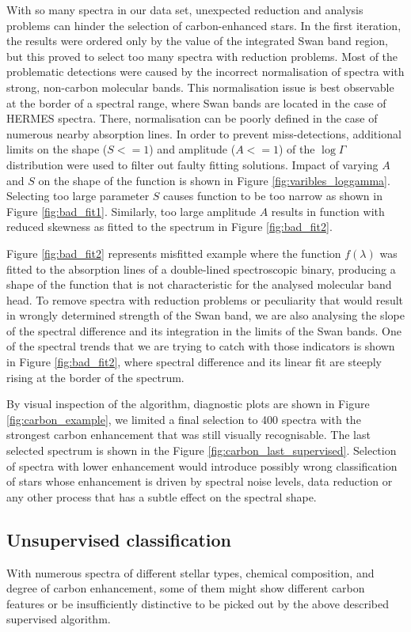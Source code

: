 With so many spectra in our data set, unexpected reduction and analysis problems can hinder the selection of carbon-enhanced stars. In the first iteration, the results were ordered only by the value of the integrated Swan band region, but this proved to select too many spectra with reduction problems. Most of the problematic detections were caused by the incorrect normalisation of spectra with strong, non-carbon molecular bands. This normalisation issue is best observable at the border of a spectral range, where Swan bands are located in the case of HERMES spectra. There, normalisation can be poorly defined in the case of numerous nearby absorption lines. In order to prevent miss-detections, additional limits on the shape ($S <= 1$) and amplitude ($A <= 1$) of the $\log{}\Gamma$ distribution were used to filter out faulty fitting solutions. Impact of varying $A$ and $S$ on the shape of the function is shown in Figure \ref{fig:varibles_loggamma}. Selecting too large parameter $S$ causes function to be too narrow as shown in Figure \ref{fig:bad_fit1}. Similarly, too large amplitude $A$ results in function with reduced skewness as fitted to the spectrum in Figure \ref{fig:bad_fit2}. 

Figure \ref{fig:bad_fit2} represents misfitted example where the function $f(\lambda)$ was fitted to the absorption lines of a double-lined spectroscopic binary, producing a shape of the function that is not characteristic for the analysed molecular band head. To remove spectra with reduction problems or peculiarity that would result in wrongly determined strength of the Swan band, we are also analysing the slope of the spectral difference and its integration in the limits of the Swan bands. One of the spectral trends that we are trying to catch with those indicators is shown in Figure \ref{fig:bad_fit2}, where spectral difference and its linear fit are steeply rising at the border of the spectrum.

By visual inspection of the algorithm, diagnostic plots are shown in Figure \ref{fig:carbon_example}, we limited a final selection to 400 spectra with the strongest carbon enhancement that was still visually recognisable. The last selected spectrum is shown in the Figure \ref{fig:carbon_last_supervised}. Selection of spectra with lower enhancement would introduce possibly wrong classification of stars whose enhancement is driven by spectral noise levels, data reduction or any other process that has a subtle effect on the spectral shape.

\subsection{Unsupervised classification}
\label{sec:unsupervised}
With numerous spectra of different stellar types, chemical composition, and degree of carbon enhancement, some of them might show different carbon features or be insufficiently distinctive to be picked out by the above described supervised algorithm.

